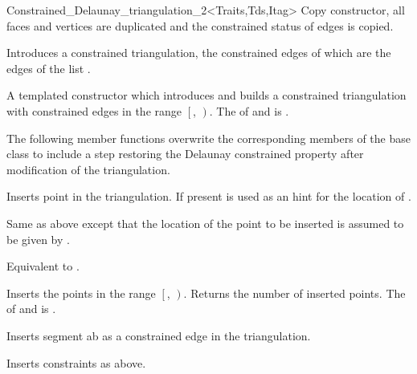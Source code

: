 \begin{ccRefClass}{Constrained_Delaunay_triangulation_2<Traits,Tds,Itag>}
 {Copy constructor, all faces and vertices
are duplicated and  the constrained status of edges
is copied.}

{Introduces a constrained triangulation, the constrained edges of which
are the edges of the list .}


{A templated constructor which introduces and builds
 a constrained triangulation with constrained edges in the range 
$\left[\right.$, $\left.\right)$.
\ccPrecond The  of  and 
 is .}



The following member functions overwrite the corresponding
members of the base class to include a step restoring
 the Delaunay constrained
property after modification of the triangulation.

{ Inserts point  in the triangulation. 
If present  is used as an hint
for the location of .}

{Same as above except that the location of the point
  to be inserted is assumed to be given by
.}

{Equivalent to .}

{Inserts the points in the range
 $\left[\right.$, $\left.\right)$.
 Returns the number of inserted points.
 \ccPrecond The  of  and 
 is .}

{ Inserts segment ab as a constrained edge in the triangulation. }

{Inserts constraints  as above.}



\end{ccRefClass}
